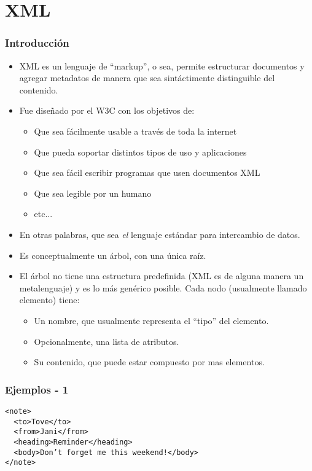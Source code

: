 \section{XML}

\begin{frame}
\frametitle{Introducción}
\begin{itemize}

\item	XML es un lenguaje de ``markup'', o sea, permite estructurar documentos
	y agregar metadatos de manera que sea sintáctimente distinguible del
	contenido.
	\pause

\item	Fue diseñado por el W3C con los objetivos de:
\begin{itemize}
	\item	Que sea fácilmente usable a través de toda la internet
	\item	Que pueda soportar distintos tipos de uso y aplicaciones
	\item	Que sea fácil escribir programas que usen documentos XML
	\item	Que sea legible por un humano
	\item	etc...
\end{itemize}
\pause

\item	En otras palabras, que sea {\it el} lenguaje estándar para intercambio
	de datos.
\pause

\item	Es conceptualmente un árbol, con una única raíz.
\pause

\item	El árbol no tiene una estructura predefinida (XML es de alguna manera
	un metalenguaje) y es lo más genérico posible. Cada nodo (usualmente
	llamado elemento) tiene:
	\pause
\begin{itemize}
	\item	Un nombre, que usualmente representa el ``tipo''
		del elemento.
		\pause
	\item	Opcionalmente, una lista de atributos.
		\pause
	\item	Su contenido, que puede estar compuesto por
		mas elementos.
\end{itemize}

\end{itemize}
\end{frame}

\begin{frame}
\frametitle{Ejemplos - 1}
\footnotesize
\texttt{<note>						\\
	~~<to>Tove</to>					\\
	~~<from>Jani</from>				\\
	~~<heading>Reminder</heading>			\\
	~~<body>Don't forget me this weekend!</body>	\\
	</note>
}
\end{frame}

